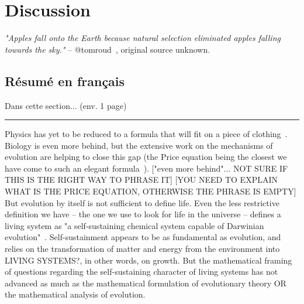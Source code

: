 \chapter{Discussion}
\label{chap:discussion}

\textit{"Apples fall onto the Earth because natural selection eliminated apples falling towards the sky."} -- @tomroud~\cite{tomroud_tom_2016}, original source unknown.

\section*{Résumé en français}

Dans cette section... (env. 1 page)

\begin{center}
\noindent\rule{4cm}{0.1pt}
\end{center}

Physics has yet to be reduced to a formula that will fit on a piece of clothing~\cite{falk_universe_2005}.
Biology is even more behind, but the extensive work on the mechanisms of evolution are helping to close this gap (the Price equation being the closest we have come to such an elegant formula~\cite{frank_natural_2012}). ["even more behind"... NOT SURE IF THIS IS THE RIGHT WAY TO PHRASE IT] [YOU NEED TO EXPLAIN WHAT IS THE PRICE EQUATION, OTHERWISE THE PHRASE IS EMPTY]
But evolution by itself is not sufficient to define life.
Even the less restrictive definition we have -- the one we use to look for life in the universe -- defines a living system as "a self-sustaining chemical system capable of Darwinian evolution"~\cite{deamer_origins_1994,benner_defining_2010}.
Self-sustainment appears to be as fundamental as evolution, and relies on the transformation of matter and energy from the environment into LIVING SYSTEMS?, in other words, on growth.
But the mathematical framing of questions regarding the self-sustaining character of living systems has not advanced as much as the mathematical formulation of evolutionary theory OR the mathematical analysis of evolution.

